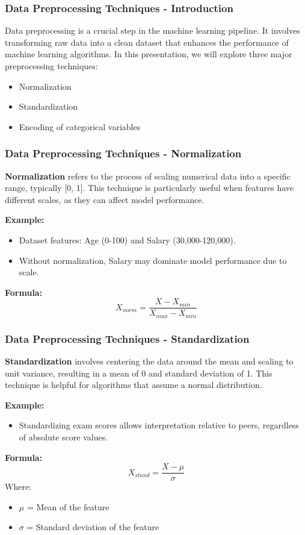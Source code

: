 \documentclass[aspectratio=169]{beamer}
\begin{document}
\begin{frame}[fragile]
    \frametitle{Data Preprocessing Techniques - Introduction}
    Data preprocessing is a crucial step in the machine learning pipeline. It involves transforming raw data into a clean dataset that enhances the performance of machine learning algorithms. 
    In this presentation, we will explore three major preprocessing techniques:
    \begin{itemize}
        \item Normalization
        \item Standardization
        \item Encoding of categorical variables
    \end{itemize}
\end{frame}

\begin{frame}[fragile]
    \frametitle{Data Preprocessing Techniques - Normalization}
    \textbf{Normalization} refers to the process of scaling numerical data into a specific range, typically [0, 1]. 
    This technique is particularly useful when features have different scales, as they can affect model performance. 

    \textbf{Example:}
    \begin{itemize}
        \item Dataset features: Age (0-100) and Salary (30,000-120,000).
        \item Without normalization, Salary may dominate model performance due to scale.
    \end{itemize}

    \textbf{Formula:}
    \begin{equation}
        X_{norm} = \frac{X - X_{min}}{X_{max} - X_{min}}
    \end{equation}
\end{frame}

\begin{frame}[fragile]
    \frametitle{Data Preprocessing Techniques - Standardization}
    \textbf{Standardization} involves centering the data around the mean and scaling to unit variance, resulting in a mean of 0 and standard deviation of 1. 
    This technique is helpful for algorithms that assume a normal distribution.

    \textbf{Example:}
    \begin{itemize}
        \item Standardizing exam scores allows interpretation relative to peers, regardless of absolute score values.
    \end{itemize}

    \textbf{Formula:}
    \begin{equation}
        X_{stand} = \frac{X - \mu}{\sigma}
    \end{equation}
    Where:
    \begin{itemize}
        \item \( \mu \) = Mean of the feature
        \item \( \sigma \) = Standard deviation of the feature
    \end{itemize}
\end{frame}
\end{document}
